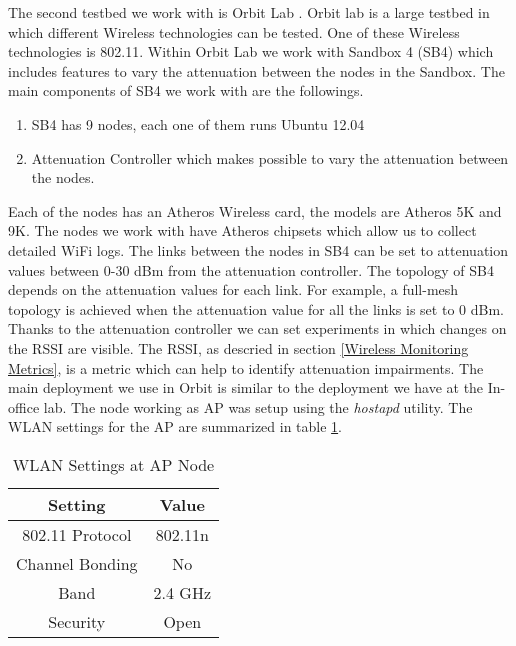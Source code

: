The second testbed we work with is Orbit Lab \cite{orbit2005}. Orbit lab is a large testbed in which different Wireless technologies can be tested. One of these Wireless technologies is 802.11. Within Orbit Lab we work with Sandbox 4 (SB4) which includes features to vary the attenuation between the nodes in the Sandbox. The main components of SB4 we work with are the followings.

\begin{enumerate}
	\item SB4 has 9 nodes, each one of them runs Ubuntu 12.04
	\item Attenuation Controller which makes possible to vary the attenuation between the nodes.
\end{enumerate}

Each of the nodes has an Atheros Wireless card, the models are Atheros 5K and 9K. The nodes we work with have Atheros chipsets which allow us to collect detailed WiFi logs. The links between the nodes in SB4 can be set to attenuation values between 0-30 dBm from the attenuation controller. The topology of SB4 depends on the attenuation values for each link. For example, a full-mesh topology is achieved when the attenuation value for all the links is set to 0 dBm. Thanks to the attenuation controller we can set experiments in which changes on the RSSI are visible. The RSSI, as descried in section \ref{Wireless Monitoring Metrics}, is a metric which can help to identify attenuation impairments. The main deployment we use in  Orbit is similar to the deployment we have at the In-office lab. The node working as AP was setup using the \emph{hostapd} utility. The WLAN settings for the AP are summarized in table \ref{table:WLAN_Settings_AP_Node}.

\begin{table}[h]
	\begin{center}
		\begin{tabular}{||c c||}
			\hline
			Setting & Value\\ [0.5ex] 
			\hline\hline
			802.11 Protocol & 802.11n\\ 
			\hline
			Channel Bonding & No\\
			\hline
			Band & 2.4 GHz\\
			\hline
			Security & Open\\ [1ex] 
			\hline
		\end{tabular}
	\end{center}
\caption{WLAN Settings at AP Node}
\label{table:WLAN_Settings_AP_Node}
\end{table} 


